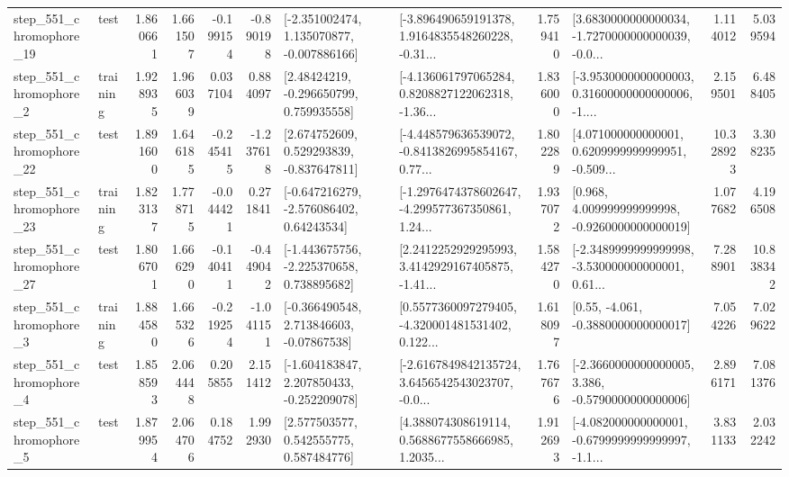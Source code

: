 \begin{tabular}{llrrrrllrlrr}
  step\_551\_chromophore\_19 &      test &      1.860661 &    1.661507 &     -0.199154 & -0.890198 &   [-2.351002474, 1.135070877, -0.007886166] &  [-3.896490659191378, 1.9164835548260228, -0.31... &       1.759410 &  [3.6830000000000034, -1.7270000000000039, -0.0... &            1.114012 &          5.039594 \\
   step\_551\_chromophore\_2 &  training &      1.928935 &    1.966039 &      0.037104 &  0.884097 &     [2.48424219, -0.296650799, 0.759935558] &  [-4.136061797065284, 0.8208827122062318, -1.36... &       1.836000 &  [-3.9530000000000003, 0.31600000000000006, -1.... &            2.159501 &          6.488405 \\
  step\_551\_chromophore\_22 &      test &      1.891600 &    1.646185 &     -0.245415 & -1.237618 &    [2.674752609, 0.529293839, -0.837647811] &  [-4.448579636539072, -0.8413826995854167, 0.77... &       1.802289 &  [4.071000000000001, 0.6209999999999951, -0.509... &           10.328923 &          3.308235 \\
  step\_551\_chromophore\_23 &  training &      1.823137 &    1.778715 &     -0.044421 &  0.271841 &    [-0.647216279, -2.576086402, 0.64243534] &  [-1.2976474378602647, -4.299577367350861, 1.24... &       1.937072 &    [0.968, 4.009999999999998, -0.9260000000000019] &            1.077682 &          4.196508 \\
  step\_551\_chromophore\_27 &      test &      1.806701 &    1.666290 &     -0.140411 & -0.449042 &   [-1.443675756, -2.225370658, 0.738895682] &  [2.2412252929295993, 3.4142929167405875, -1.41... &       1.584270 &  [-2.3489999999999998, -3.530000000000001, 0.61... &            7.288901 &         10.838342 \\
   step\_551\_chromophore\_3 &  training &      1.884580 &    1.665326 &     -0.219254 & -1.041151 &    [-0.366490548, 2.713846603, -0.07867538] &  [0.5577360097279405, -4.320001481531402, 0.122... &       1.618097 &                [0.55, -4.061, -0.3880000000000017] &            7.054226 &          7.029622 \\
   step\_551\_chromophore\_4 &      test &      1.858593 &    2.064448 &      0.205855 &  2.151412 &   [-1.604183847, 2.207850433, -0.252209078] &  [-2.6167849842135724, 3.6456542543023707, -0.0... &       1.767676 &  [-2.3660000000000005, 3.386, -0.5790000000000006] &            2.896171 &          7.081376 \\
   step\_551\_chromophore\_5 &      test &      1.879954 &    2.064706 &      0.184752 &  1.992930 &     [2.577503577, 0.542555775, 0.587484776] &  [4.388074308619114, 0.5688677558666985, 1.2035... &       1.912693 &  [-4.082000000000001, -0.6799999999999997, -1.1... &            3.831133 &          2.032242 \\

\end{tabular}
